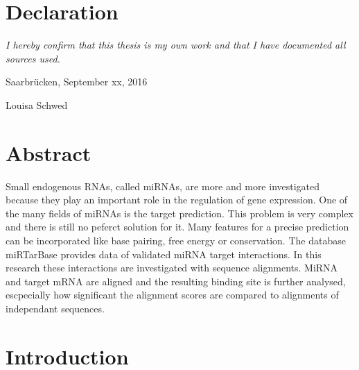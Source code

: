 \documentclass[12pt]{article}
\begin{document}
\section*{Declaration}
\emph{I hereby confirm that this thesis is my own work and that I have documented all sources used.}

\vspace{1cm}

\noindent Saarbr\"ucken, September xx, 2016
\vspace{1.5cm}

\noindent Louisa Schwed
\newpage
\mbox{}



\tableofcontents

\newpage 
\pagestyle{plain}



\section*{Abstract}

Small endogenous RNAs, called miRNAs, are more and more investigated because they play an important role in the regulation of gene expression. One of the many fields of miRNAs is the target prediction. This problem is very complex and there is still no peferct solution for it. Many features for a precise prediction can be incorporated like base pairing, free energy or conservation. The database miRTarBase provides data of validated miRNA target interactions. In this research these interactions are investigated with sequence alignments. MiRNA and target mRNA are aligned and the resulting binding site is further analysed, escpecially how significant the alignment scores are compared to alignments of independant sequences.
 
 
\vspace{1.5cm}


\section{Introduction}
\end{document}
